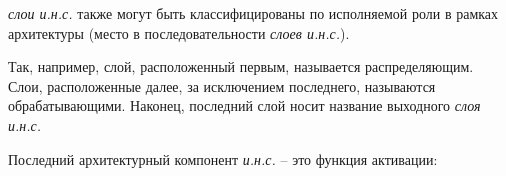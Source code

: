 \textit{слои и.н.с.} также могут быть классифицированы по исполняемой роли в рамках архитектуры (место в последовательности \textit{слоев и.н.с.}).

Так, например, слой, расположенный первым, называется распределяющим. Слои, расположенные далее, за исключением последнего, называются обрабатывающими. Наконец, последний слой носит название выходного \textit{слоя и.н.с.}

Последний архитектурный компонент \textit{и.н.с.} -- это функция активации:

\begin{SCn}
\end{SCn}


